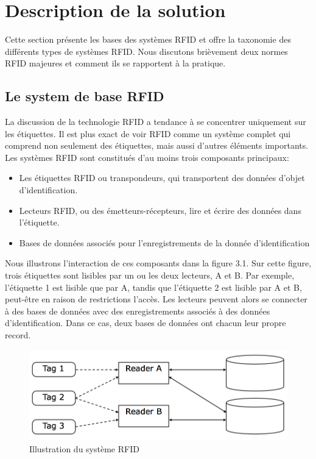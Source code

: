 \documentclass[11pt, a4paper, twoside]{book}
\begin{document}
\section{Description de la solution}
Cette section présente les bases des systèmes RFID et offre la taxonomie des différents types de systèmes RFID. Nous discutons brièvement deux normes RFID majeures et comment ils se rapportent à la pratique.
\subsection{Le system de base RFID}
La discussion de la technologie RFID a tendance à se concentrer uniquement sur les étiquettes. Il est plus exact de voir RFID comme un système complet qui comprend non seulement des étiquettes, mais aussi d'autres éléments importants. Les systèmes RFID sont constitués d'au moins trois composants principaux:
\begin{itemize}
\item Les étiquettes RFID ou transpondeurs, qui transportent des données d'objet d'identification.
\item Lecteurs RFID, ou des émetteurs-récepteurs, lire et écrire des données dans l'étiquette.
\item Bases de données associés pour l'enregistrements de la donnée d'identification\\
\end{itemize}

Nous illustrons l'interaction de ces composants dans la figure 3.1. Sur cette figure, trois étiquettes sont lisibles par un ou les deux lecteurs, A et B. Par exemple, l'étiquette 1 est lisible que par A, tandis que l'étiquette 2 est lisible par A et B, peut-être en raison de restrictions l'accès. Les lecteurs peuvent alors se connecter à des bases de données avec des enregistrements associés à des données d'identification. Dans ce cas, deux bases de données ont chacun leur propre record.\\
\begin{figure}[h!]
\centering
\includegraphics[width=\textwidth]{shema}
\caption{Illustration du système RFID}
\end{figure}
\end{document}
